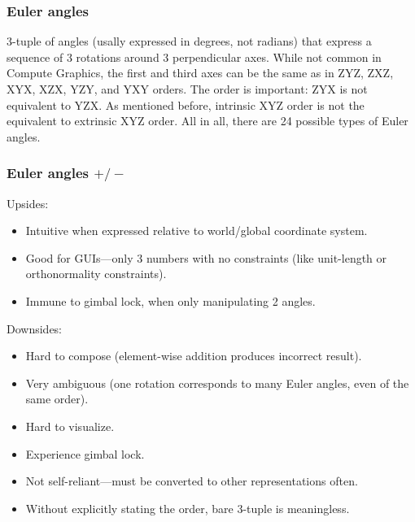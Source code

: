 \documentclass{beamer}
\begin{document}
\begin{frame}
\frametitle{Euler angles}
3-tuple of angles (usally expressed in degrees, not radians) that express a sequence of 3 rotations around 3 perpendicular axes. 
\vfill
While not common in Compute Graphics, the first and third axes can be the same as in ZYZ, ZXZ, XYX, XZX, YZY, and YXY orders. 
\vfill
The order is important: ZYX is not equivalent to YZX. As mentioned before, intrinsic XYZ order is not the equivalent to extrinsic XYZ order. 
\vfill
All in all, there are 24 possible types of Euler angles.
\end{frame}

\begin{frame}
\frametitle{Euler angles $+/-$}
Upsides:
\begin{itemize}
	\item Intuitive when expressed relative to world/global coordinate system.
	\item Good for GUIs---only 3 numbers with no constraints (like unit-length or orthonormality constraints).
	\item Immune to gimbal lock, when only manipulating 2 angles.
\end{itemize}
Downsides:
\begin{itemize}
	\item Hard to compose (element-wise addition produces incorrect result).
	\item Very ambiguous (one rotation corresponds to many Euler angles, even of the same order).
	\item Hard to visualize.
	\item Experience gimbal lock.
	\item Not self-reliant---must be converted to other representations often.
	\item Without explicitly stating the order, bare 3-tuple is meaningless.
\end{itemize}	
\end{frame}
\end{document}
